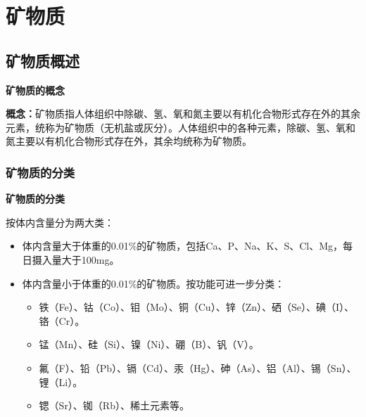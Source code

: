 \chapter{矿物质}

\section{矿物质概述}

\begin{keybox}
\textbf{矿物质的概念}

\textbf{概念：}矿物质指人体组织中除碳、氢、氧和氮主要以有机化合物形式存在外的其余元素，统称为矿物质（无机盐或灰分）。人体组织中的各种元素，除碳、氢、氧和氮主要以有机化合物形式存在外，其余均统称为矿物质。
\end{keybox}

\subsection{矿物质的分类}

\begin{defbox}
\textbf{矿物质的分类}

按体内含量分为两大类：
\begin{itemize}[leftmargin=*]
    \item {}体内含量大于体重的0.01\%的矿物质，包括Ca、P、Na、K、S、Cl、Mg，每日摄入量大于100mg。
    \item {}体内含量小于体重的0.01\%的矿物质。按功能可进一步分类：
    \begin{itemize}[leftmargin=*]
        \item {}铁（Fe）、钴（Co）、钼（Mo）、铜（Cu）、锌（Zn）、硒（Se）、碘（I）、铬（Cr）。
        \item {}锰（Mn）、硅（Si）、镍（Ni）、硼（B）、钒（V）。
        \item {}氟（F）、铅（Pb）、镉（Cd）、汞（Hg）、砷（As）、铝（Al）、锡（Sn）、锂（Li）。
        \item {}锶（Sr）、铷（Rb）、稀土元素等。
    \end{itemize}
\end{itemize}
\end{defbox}

